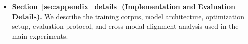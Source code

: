 \begin{appendices}
\begin{itemize}
  \item \textbf{Section~\ref{sec:appendix_details} (Implementation and Evaluation Details).}
  We describe the training corpus, model architecture, optimization setup, evaluation protocol, and cross-modal alignment analysis used in the main experiments.

\end{itemize}







\end{appendices}
